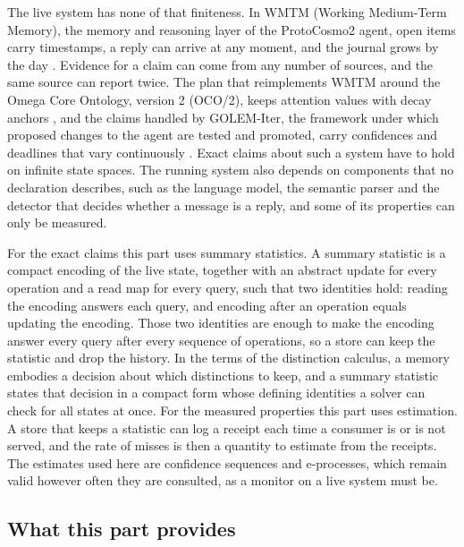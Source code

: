 \documentclass[11pt]{article}
\theoremstyle{definition}
\theoremstyle{plain}
\begin{document}
The live system has none of that finiteness. In WMTM (Working Medium-Term Memory), the memory and
reasoning layer of the ProtoCosmo2 agent, open items carry timestamps, a reply can arrive at any
moment, and the journal grows by the day \cite{wmtm}. Evidence for a claim can come from any number
of sources, and the same source can report twice. The plan that reimplements WMTM around the Omega
Core Ontology, version 2 (OCO/2), keeps attention values with decay anchors \cite{oco2}, and the
claims handled by GOLEM-Iter, the framework under which proposed changes to the agent are tested
and promoted, carry confidences and deadlines that vary continuously \cite{golemspec}. Exact claims
about such a system have to hold on infinite state spaces. The running system also depends on
components that no declaration describes, such as the language model, the semantic parser and the
detector that decides whether a message is a reply, and some of its properties can only be
measured.

For the exact claims this part uses summary statistics. A summary statistic is a compact encoding
of the live state, together with an abstract update for every operation and a read map for every
query, such that two identities hold: reading the encoding answers each query, and encoding after
an operation equals updating the encoding. Those two identities are enough to make the encoding
answer every query after every sequence of operations, so a store can keep the statistic and drop
the history. In the terms of the distinction calculus, a memory embodies a decision about which
distinctions to keep, and a summary statistic states that decision in a compact form whose
defining identities a solver can check for all states at once. For the measured properties this
part uses estimation. A store that keeps a statistic can log a receipt each time a consumer is or
is not served, and the rate of misses is then a quantity to estimate from the receipts. The
estimates used here are confidence sequences and e-processes, which remain valid however often they
are consulted, as a monitor on a live system must be.

\subsection{What this part provides}
\end{document}
